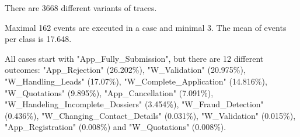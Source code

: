 There are 3668 different variants of traces.

Maximal 162 events are executed in a case and minimal 3. The mean of events per class is 17.648.

All cases start with "App\_Fully\_Submission", but there are 12 different outcomes: 
"App\_Rejection" (26.202\%), "W\_Validation" (20.975\%), "W\_Handling\_Leads" (17.07\%), "W\_Complete\_Application" (14.816\%), "W\_Quotations" (9.895\%), "App\_Cancellation" (7.091\%), "W\_Handeling\_Incomplete\_Dossiers" (3.454\%), "W\_Fraud\_Detection" (0.436\%), "W\_Changing\_Contact\_Details" (0.031\%), "W\_Validation" (0.015\%), "App\_Registration" (0.008\%) and "W\_Quotations" (0.008\%).
